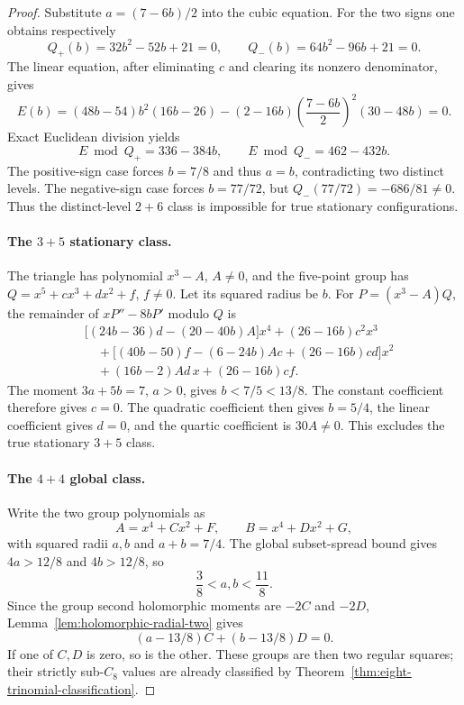 \documentclass[11pt]{article}
\theoremstyle{remark}
\numberwithin{equation}{section}
\begin{document}
\begin{proof}
Substitute $a=(7-6b)/2$ into the cubic equation. For the two signs
one obtains respectively
\[
 Q_+(b)=32b^2-52b+21=0,\qquad
 Q_-(b)=64b^2-96b+21=0.
\]
The linear equation, after eliminating $c$ and clearing its nonzero
denominator, gives
\[
 E(b)=(48b-54)b^2(16b-26)
       -(2-16b)\left(\frac{7-6b}{2}\right)^2(30-48b)=0.
\]
Exact Euclidean division yields
\[
 E\bmod Q_+=336-384b,\qquad
 E\bmod Q_-=462-432b.
\]
The positive-sign case forces $b=7/8$ and thus $a=b$, contradicting
two distinct levels. The negative-sign case forces $b=77/72$, but
$Q_-(77/72)=-686/81\ne0$. Thus the distinct-level $2+6$ class is
impossible for true stationary configurations.

\paragraph{The $3+5$ stationary class.}
The triangle has polynomial $x^3-A$, $A\ne0$, and the five-point
group has $Q=x^5+cx^3+dx^2+f$, $f\ne0$. Let its squared radius be
$b$. For $P=(x^3-A)Q$, the remainder of $xP''-8bP'$ modulo $Q$ is
\begin{align*}
 &\bigl[(24b-36)d-(20-40b)A\bigr]x^4+(26-16b)c^2x^3\\
 &\quad+\bigl[(40b-50)f-(6-24b)Ac+(26-16b)cd\bigr]x^2\\
 &\quad +(16b-2)Ad\,x+(26-16b)cf.
\end{align*}
The moment $3a+5b=7$, $a>0$, gives $b<7/5<13/8$.
The constant coefficient therefore gives $c=0$.
The quadratic coefficient then gives $b=5/4$, the linear coefficient
gives $d=0$, and the quartic coefficient is $30A\ne0$.
This excludes the true stationary $3+5$ class.

\paragraph{The $4+4$ global class.}
Write the two group polynomials as
\[
 A=x^4+Cx^2+F,\qquad B=x^4+Dx^2+G,
\]
with squared radii $a,b$ and $a+b=7/4$. The global subset-spread
bound gives $4a>12/8$ and $4b>12/8$, so
\begin{equation}\label{eq:n8-fourfour-global-domain}
                       \frac38<a,b<\frac{11}8.
\end{equation}
Since the group second holomorphic moments are $-2C$ and $-2D$,
Lemma~\ref{lem:holomorphic-radial-two} gives
\[
                 (a-13/8)C+(b-13/8)D=0.
\]
If one of $C,D$ is zero, so is the other. These groups are then two
regular squares; their strictly sub-$C_8$ values are already classified
by Theorem~\ref{thm:eight-trinomial-classification}.


\end{proof}
\end{document}
